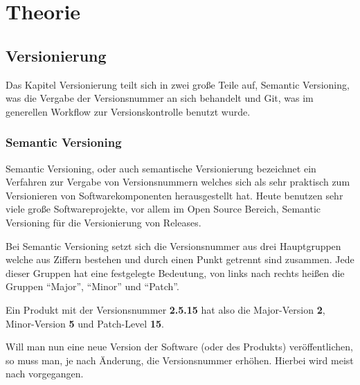 \section{Theorie}
\label{sec:theorie}
\subsection{Versionierung}
Das Kapitel Versionierung teilt sich in zwei große Teile auf, Semantic Versioning, was die Vergabe der Versionsnummer an sich behandelt und Git, was im generellen Workflow zur Versionskontrolle benutzt wurde.

\subsubsection{Semantic Versioning}
Semantic Versioning, oder auch semantische Versionierung bezeichnet ein Verfahren zur Vergabe von Versionsnummern welches sich als sehr praktisch zum Versionieren von Softwarekomponenten herausgestellt hat. Heute benutzen sehr viele große Softwareprojekte, vor allem im Open Source Bereich, Semantic Versioning für die Versionierung von Releases.

Bei Semantic Versioning setzt sich die Versionsnummer aus drei Hauptgruppen welche aus Ziffern bestehen und durch einen Punkt getrennt sind zusammen. Jede dieser Gruppen hat eine festgelegte Bedeutung, von links nach rechts heißen die Gruppen \enquote{Major}, \enquote{Minor} und \enquote{Patch}.

Ein Produkt mit der Versionsnummer \textbf{2.5.15} hat also die Major-Version \textbf{2}, Minor-Version \textbf{5} und Patch-Level \textbf{15}.

Will man nun eine neue Version der Software (oder des Produkts) veröffentlichen, so muss man, je nach Änderung, die Versionsnummer erhöhen. Hierbei wird meist nach  vorgegangen.


